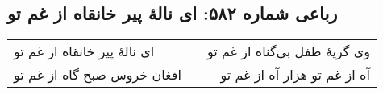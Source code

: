 \begin{center}
\section*{رباعی شماره ۵۸۲: ای نالهٔ پیر خانقاه از غم تو}
\label{sec:sh582}
\begin{longtable}{l p{0.5cm} r}
ای نالهٔ پیر خانقاه از غم تو
&&
وی گریهٔ طفل بی‌گناه از غم تو
\\
افغان خروس صبح گاه از غم تو
&&
آه از غم تو هزار آه از غم تو
\\
\end{longtable}
\end{center}
